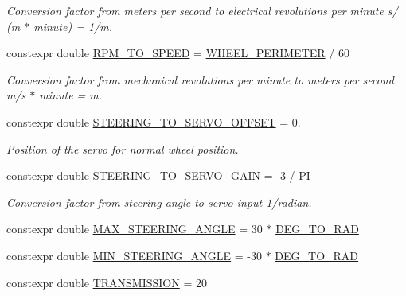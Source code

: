 \begin{DoxyCompactItemize}
\begin{DoxyCompactList}\small\item\em Conversion factor from meters per second to electrical revolutions per minute  s/ (m $\ast$ minute) = 1/m. \end{DoxyCompactList}\item 
constexpr double \hyperlink{namespacecar__config_aee034b6adfd7932f245bc94d869f2bb6}{R\+P\+M\+\_\+\+T\+O\+\_\+\+S\+P\+E\+ED} = \hyperlink{namespacecar__config_a46fe00906da07d2e030b586a634cd907}{W\+H\+E\+E\+L\+\_\+\+P\+E\+R\+I\+M\+E\+T\+ER} / 60
\begin{DoxyCompactList}\small\item\em Conversion factor from mechanical revolutions per minute to meters per second  m/s $\ast$ minute = m. \end{DoxyCompactList}\item 
constexpr double \hyperlink{namespacecar__config_abb6ef746663276219b321683dfbb8896}{S\+T\+E\+E\+R\+I\+N\+G\+\_\+\+T\+O\+\_\+\+S\+E\+R\+V\+O\+\_\+\+O\+F\+F\+S\+ET} = 0.
\begin{DoxyCompactList}\small\item\em Position of the servo for normal wheel position. \end{DoxyCompactList}\item 
constexpr double \hyperlink{namespacecar__config_aa8ab85fe7b8ab728f34d15028f114d86}{S\+T\+E\+E\+R\+I\+N\+G\+\_\+\+T\+O\+\_\+\+S\+E\+R\+V\+O\+\_\+\+G\+A\+IN} = -\/3 / \hyperlink{namespacecar__config_a90cb9957197db8924811c447bc98703a}{PI}
\begin{DoxyCompactList}\small\item\em Conversion factor from steering angle to servo input  1/radian. \end{DoxyCompactList}\item 
constexpr double \hyperlink{namespacecar__config_a967b325af26effe80fbbc64dc68a36a0}{M\+A\+X\+\_\+\+S\+T\+E\+E\+R\+I\+N\+G\+\_\+\+A\+N\+G\+LE} = 30 $\ast$ \hyperlink{namespacecar__config_a72deaa1a555d694e52fb768ffba1d8cb}{D\+E\+G\+\_\+\+T\+O\+\_\+\+R\+AD}
\item 
constexpr double \hyperlink{namespacecar__config_a38229ce5d2e17e0c30b86864fb20d9ce}{M\+I\+N\+\_\+\+S\+T\+E\+E\+R\+I\+N\+G\+\_\+\+A\+N\+G\+LE} = -\/30 $\ast$ \hyperlink{namespacecar__config_a72deaa1a555d694e52fb768ffba1d8cb}{D\+E\+G\+\_\+\+T\+O\+\_\+\+R\+AD}
\item 
constexpr double \hyperlink{namespacecar__config_a7af97a6c9168673aba8917029cfe44d3}{T\+R\+A\+N\+S\+M\+I\+S\+S\+I\+ON} = 20

\end{DoxyCompactItemize}
